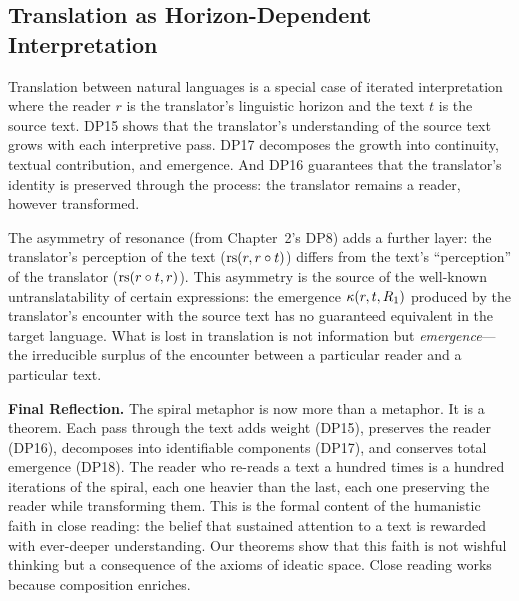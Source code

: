 \subsection{Translation as Horizon-Dependent Interpretation}

Translation between natural languages is a special case of iterated
interpretation where the reader $r$ is the translator's linguistic
horizon and the text $t$ is the source text. DP15 shows that the
translator's understanding of the source text grows with each
interpretive pass. DP17 decomposes the growth into continuity,
textual contribution, and emergence. And DP16 guarantees that the
translator's identity is preserved through the process: the translator
remains a reader, however transformed.

The asymmetry of resonance (from Chapter~2's DP8) adds a further layer:
the translator's perception of the text ($\mathrm{rs}(r, r \circ t)$) differs
from the text's ``perception'' of the translator
($\mathrm{rs}(r \circ t, r)$). This asymmetry is the source of the
well-known untranslatability of certain expressions: the emergence
$\kappa(r, t, R_1)$ produced by the translator's encounter with the
source text has no guaranteed equivalent in the target language. What
is lost in translation is not information but \emph{emergence}---the
irreducible surplus of the encounter between a particular reader and
a particular text.

\begin{reflectionbox}
\textbf{Final Reflection.}
The spiral metaphor is now more than a metaphor. It is a theorem.
Each pass through the text adds weight (DP15), preserves the reader
(DP16), decomposes into identifiable components (DP17), and conserves
total emergence (DP18). The reader who re-reads a text a hundred times
is a hundred iterations of the spiral, each one heavier than the last,
each one preserving the reader while transforming them. This is the
formal content of the humanistic faith in close reading: the belief that
sustained attention to a text is rewarded with ever-deeper understanding.
Our theorems show that this faith is not wishful thinking but a
consequence of the axioms of ideatic space. Close reading works because
composition enriches.
\end{reflectionbox}



